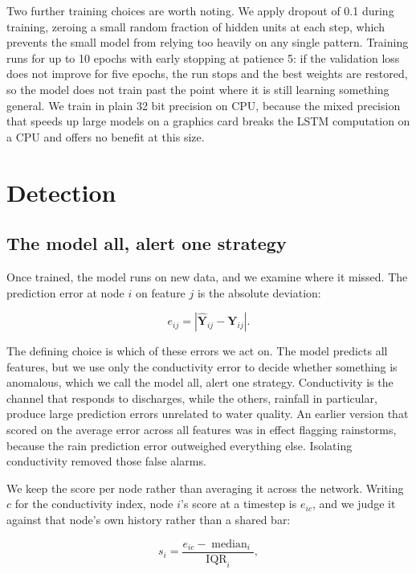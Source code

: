 \documentclass{article}
\begin{document}
Two further training choices are worth noting. We apply dropout of 0.1 during
training, zeroing a small random fraction of hidden units at each step, which
prevents the small model from relying too heavily on any single pattern.
Training runs for up to 10 epochs with early stopping at patience 5: if the
validation loss does not improve for five epochs, the run stops and the best
weights are restored, so the model does not train past the point where it is
still learning something general. We train in plain 32 bit precision on CPU,
because the mixed precision that speeds up large models on a graphics card
breaks the LSTM computation on a CPU and offers no benefit at this size.

\section{Detection}
\label{sec:detection}

\subsection{The model all, alert one strategy}
\label{sec:score}

Once trained, the model runs on new data, and we examine where it missed. The
prediction error at node $i$ on feature $j$ is the absolute deviation:

\begin{equation}
  \label{eq:error}
  e_{ij} = \left\lvert \hat{\mathbf{Y}}_{ij} - \mathbf{Y}_{ij} \right\rvert.
\end{equation}

The defining choice is which of these errors we act on. The model predicts all
features, but we use only the conductivity error to decide whether something
is anomalous, which we call the model all, alert one strategy. Conductivity is
the channel that responds to discharges, while the others, rainfall in
particular, produce large prediction errors unrelated to water quality. An
earlier version that scored on the average error across all features was in
effect flagging rainstorms, because the rain prediction error outweighed
everything else. Isolating conductivity removed those false alarms.

We keep the score per node rather than averaging it across the network. Writing
$c$ for the conductivity index, node $i$'s score at a timestep is $e_{ic}$, and
we judge it against that node's own history rather than a shared bar:

\begin{equation}
  \label{eq:score}
  s_i = \frac{e_{ic} - \operatorname{median}_i}{\operatorname{IQR}_i},
\end{equation}
\end{document}
